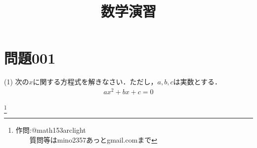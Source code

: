 \documentclass[12pt]{jarticle}
\title{数学演習}
\date{}
\begin{document}
\maketitle
{}
\section*{問題001}

(1) 次の$x$に関する方程式を解きなさい．ただし，$a, b, c$は実数とする．\begin{eqnarray*}
ax^{2}+bx+c=0 
\end{eqnarray*}

\footnote[0]{
作問:@math153arclight\\
　　質問等はmino2357あっとgmail.comまで
}

\thispagestyle{empty}
\end{document}
